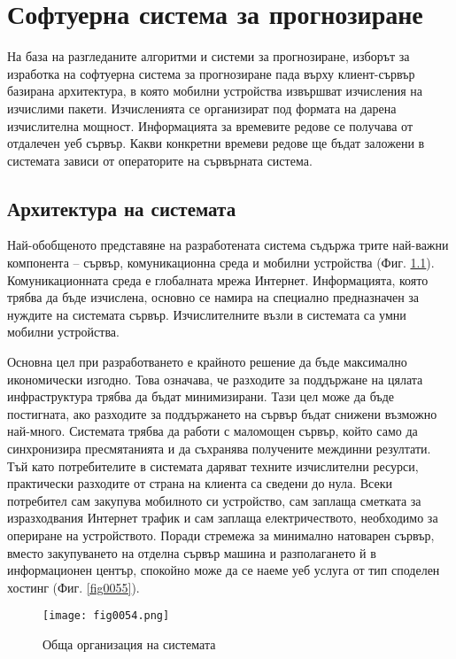 ﻿\chapter{Софтуерна система за прогнозиране}

На база на разгледаните алгоритми и системи за прогнозиране, изборът за изработка на софтуерна система за прогнозиране пада върху клиент-сървър базирана архитектура, в която мобилни устройства извършват изчисления на изчислими пакети. Изчисленията се организират под формата на дарена изчислителна мощност. Информацията за времевите редове се получава от отдалечен уеб сървър. Какви конкретни времеви редове ще бъдат заложени в системата зависи от операторите на сървърната система.

\section{Архитектура на системата}

Най-обобщеното представяне на разработената система съдържа трите най-важни компонента – сървър, комуникационна среда и мобилни устройства (Фиг. \ref{fig0054}). Комуникационната среда е глобалната мрежа Интернет. Информацията, която трябва да бъде изчислена, основно се намира на специално предназначен за нуждите на системата сървър. Изчислителните възли в системата са умни мобилни устройства. 

Основна цел при разработването е крайното решение да бъде максимално икономически изгодно. Това означава, че разходите за поддържане на цялата инфраструктура трябва да бъдат минимизирани. Тази цел може да бъде постигната, ако разходите за поддържането на сървър бъдат снижени възможно най-много. Системата трябва да работи с маломощен сървър, който само да синхронизира пресмятанията и да съхранява получените междинни резултати. Тъй като потребителите в системата даряват техните изчислителни ресурси, практически разходите от страна на клиента са сведени до нула. Всеки потребител сам закупува мобилното си устройство, сам заплаща сметката за изразходвания Интернет трафик и сам заплаща електричеството, необходимо за опериране на устройството. Поради стремежа за минимално натоварен сървър, вместо закупуването на отделна сървър машина и разполагането й в информационен център, спокойно може да се наеме уеб услуга от тип споделен хостинг (Фиг. \ref{fig0055}). 

\begin{figure}[H]
  \centering
  \texttt{[image: fig0054.png]}
  \caption{Обща организация на системата}
\label{fig0054}
\end{figure}

